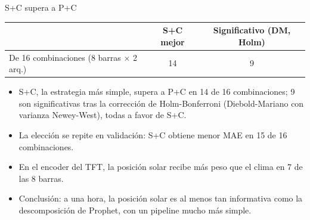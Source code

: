 \documentclass[aspectratio=169]{beamer}
\begin{document}
\begin{frame}{S+C supera a P+C}
    \begin{table}
        \centering
        \small
        \begin{tabular}{lcc}
            \toprule
             & \textbf{S+C mejor} & \textbf{Significativo (DM, Holm)} \\
            \midrule
            De 16 combinaciones (8 barras $\times$ 2 arq.) & 14 & 9 \\
            \bottomrule
        \end{tabular}
    \end{table}
    \vspace{1em}
    \begin{itemize}
        \item S+C, la estrategia más simple, supera a P+C en 14 de 16 combinaciones; 9 son significativas tras la corrección de Holm-Bonferroni (Diebold-Mariano con varianza Newey-West), todas a favor de S+C.
        \item La elección se repite en validación: S+C obtiene menor MAE en 15 de 16 combinaciones.
        \item En el encoder del TFT, la posición solar recibe más peso que el clima en 7 de las 8 barras.
        \item Conclusión: a una hora, la posición solar es al menos tan informativa como la descomposición de Prophet, con un pipeline mucho más simple.
    \end{itemize}
\end{frame}
\end{document}
